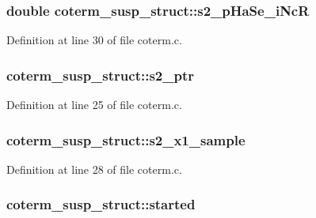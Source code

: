 \subsubsection[{\texorpdfstring{s2\+\_\+p\+Ha\+Se\+\_\+i\+NcR}{s2_pHaSe_iNcR}}]{\setlength{\rightskip}{0pt plus 5cm}double coterm\+\_\+susp\+\_\+struct\+::s2\+\_\+p\+Ha\+Se\+\_\+i\+NcR}\hypertarget{structcoterm__susp__struct_a2c4ea8194e475ddcbcbb49eaf447fe14}{}\label{structcoterm__susp__struct_a2c4ea8194e475ddcbcbb49eaf447fe14}


Definition at line 30 of file coterm.\+c.

\subsubsection[{\texorpdfstring{s2\+\_\+ptr}{s2_ptr}}]{ coterm\+\_\+susp\+\_\+struct\+::s2\+\_\+ptr}\hypertarget{structcoterm__susp__struct_a09854a76a1dfb6c9c105d51965517265}{}\label{structcoterm__susp__struct_a09854a76a1dfb6c9c105d51965517265}


Definition at line 25 of file coterm.\+c.

\subsubsection[{\texorpdfstring{s2\+\_\+x1\+\_\+sample}{s2_x1_sample}}]{ coterm\+\_\+susp\+\_\+struct\+::s2\+\_\+x1\+\_\+sample}\hypertarget{structcoterm__susp__struct_ae693d1ea090632e36bbb31434d01ca20}{}\label{structcoterm__susp__struct_ae693d1ea090632e36bbb31434d01ca20}


Definition at line 28 of file coterm.\+c.

\subsubsection[{\texorpdfstring{started}{started}}]{ coterm\+\_\+susp\+\_\+struct\+::started}\hypertarget{structcoterm__susp__struct_a750cd51a748ea2bf63c20579f126e8fc}{}\label{structcoterm__susp__struct_a750cd51a748ea2bf63c20579f126e8fc}


